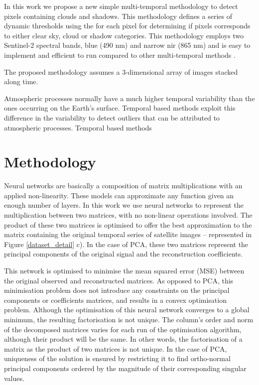\documentclass[essd, manuscript]{copernicus}
\begin{document}
In this work we propose a new simple multi-temporal methodology to detect pixels containing clouds and shadows. This methodology defines a series of dynamic thresholds using the for each pixel for determining if pixels corresponds to either clear sky, cloud or shadow categories. This methodology employs two Sentinel-2 spectral bands, blue (490 nm) and narrow nir (865 nm) and is easy to implement and efficient to run compared to other multi-temporal methods \citep{frantz2015enhancing,zhu2018automatic}.

The proposed methodology assumes a 3-dimensional array of images stacked along time. 

Atmospheric processes normally have a much higher temporal variability than the ones occurring on the Earth's surface. Temporal based methods exploit this difference in the variability to detect outliers that can be attributed to atmospheric processes. Temporal based methods  


\section{Methodology}

Neural networks are basically a composition of matrix multiplications with an applied non-linearity. These models can approximate any function given an enough number of layers. In this work we use neural networks to represent the multiplication between two matrices, with no non-linear operations involved. The product of these two matrices is optimised to offer the best approximation to the matrix containing the original temporal series of satellite images -- represented in Figure \ref{dataset_detail} c). In the case of PCA, these two matrices represent the principal components of the original signal and the reconstruction coefficients. 

This network is optimised to minimise the mean squared error (MSE) between the original observed and reconstructed matrices. As opposed to PCA, this minimisation problem does not introduce any constraints on the principal components or coefficients matrices, and results in a convex optimisation problem. Although the optimisation of this neural network converges to a global minimum, the resulting factorisation is not unique. The column's order and norm of the decomposed matrices varies for each run of the optimisation algorithm, although their product will be the same. In other words, the factorisation of a matrix as the product of two matrices is not unique. In the case of PCA, uniqueness of the solution is ensured by restricting it to find ortho-normal principal components ordered by the magnitude of their corresponding singular values.
\end{document}

